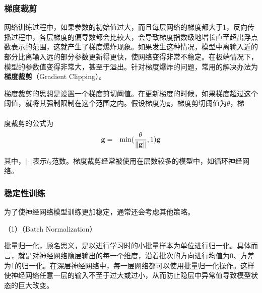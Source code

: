 
\subsubsection{梯度裁剪}

\parinterval  网络训练过程中，如果参数的初始值过大，而且每层网络的梯度都大于1，反向传播过程中，各层梯度的偏导数都会比较大，会导致梯度指数级地增长直至超出浮点数表示的范围，这就产生了梯度爆炸现象。如果发生这种情况，模型中离输入近的部分比离输入远的部分参数更新得更快，使网络变得非常不稳定。在极端情况下，模型的参数值变得非常大，甚至于溢出。针对梯度爆炸的问题，常用的解决办法为{\small\sffamily\bfseries{梯度裁剪}}（Gradient Clipping）。

\parinterval    梯度裁剪的思想是设置一个梯度剪切阈值。在更新梯度的时候，如果梯度超过这个阈值，就将其强制限制在这个范围之内。假设梯度为$ \mathbf g $，梯度剪切阈值为$ \theta $，梯\\ \\度裁剪的公式为
\begin{eqnarray}
\mathbf g&=&{\rm{min}}(\frac{\theta}{\Vert \mathbf g\Vert},1)\mathbf g
\label{eq:5-43}
\end{eqnarray}

\noindent 其中，$ \Vert \cdot \Vert $表示$ l_2 $范数。梯度裁剪经常被使用在层数较多的模型中，如循环神经网络。


\subsubsection{稳定性训练}

\parinterval  为了使神经网络模型训练更加稳定，通常还会考虑其他策略。

\parinterval  （1）{\small{}}（Batch Normalization）

\parinterval  批量归一化，顾名思义，是以进行学习时的小批量样本为单位进行归一化\cite{ioffe2015batch}。具体而言，就是对神经网络隐层输出的每一个维度，沿着批次的方向进行均值为0、方差为1的归一化。在深层神经网络中，每一层网络都可以使用批量归一化操作。这样使神经网络任意一层的输入不至于过大或过小，从而防止隐层中异常值导致模型状态的巨大改变。

